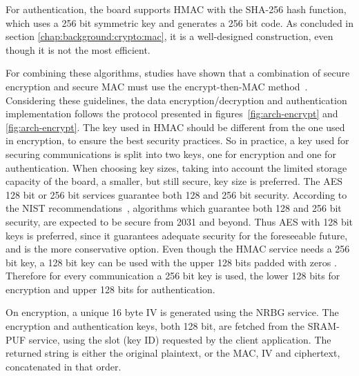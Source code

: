 For authentication, the board supports \ac{HMAC} with the \ac{SHA}-256 hash function, which uses a 256 bit symmetric key and generates a 256 bit code. As concluded in section \ref{chap:background:crypto:mac}, it is a well-designed construction, even though it is not the most efficient.

For combining these algorithms, studies have shown that a combination of secure encryption and secure \ac{MAC} must use the encrypt-then-MAC method~\cite{encryptmacorder}.
Considering these guidelines, the data encryption/decryption and authentication implementation follows the protocol presented in figures~\ref{fig:arch-encrypt} and \ref{fig:arch-encrypt}.
The key used in HMAC should be different from the one used in encryption, to ensure the best security practices. So in practice, a key used for securing communications is split into two keys, one for encryption and one for authentication.
When choosing key sizes, taking into account the limited storage capacity of the board, a smaller, but still secure, key size is preferred. The \ac{AES} 128 bit or 256 bit services guarantee both 128 and 256 bit security. According to the \ac{NIST} recommendations~\cite{nistRecommendations}, algorithms which guarantee both 128 and 256 bit security, are expected to be secure from 2031 and beyond. Thus \ac{AES} with 128 bit keys is preferred, since it guarantees adequate security for the foreseeable future, and is the more conservative option.
Even though the HMAC service needs a 256 bit key, a 128 bit key can be used with the upper 128 bits padded with zeros \cite{smartfusionSecurityPractices}.
Therefore for every communication a 256 bit key is used, the lower 128 bits for encryption and upper 128 bits for authentication.

On encryption, a unique 16 byte \ac{IV} is generated using the \ac{NRBG} service.
The encryption and authentication keys, both 128 bit, are fetched from the SRAM-PUF service, using the slot (key ID) requested by the client application.
The returned string is either the original plaintext, or the \ac{MAC}, \ac{IV} and ciphertext, concatenated in that order.



